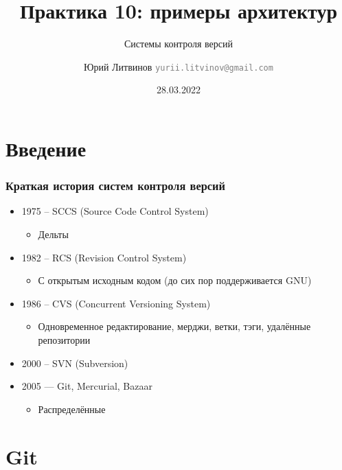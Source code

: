 \documentclass[xetex,mathserif,serif]{beamer}
\title{Практика 10: примеры архитектур}
\subtitle{Системы контроля версий}
\author[Юрий Литвинов]{Юрий Литвинов \newline \textcolor{gray}{\small\texttt{yurii.litvinov@gmail.com}}}
\date{28.03.2022}
\begin{document}
    
\frame{\titlepage}

    \section{Введение}

    \begin{frame}
        \frametitle{Краткая история систем контроля версий}
        \begin{itemize}
            \item 1975 -- SCCS (Source Code Control System)
            \begin{itemize}
                \item Дельты
            \end{itemize}
            \item 1982 -- RCS (Revision Control System)
            \begin{itemize}
                \item С открытым исходным кодом (до сих пор поддерживается GNU)
            \end{itemize}
            \item 1986 -- CVS (Concurrent Versioning System)
            \begin{itemize}
                \item Одновременное редактирование, мерджи, ветки, тэги, удалённые репозитории
            \end{itemize}
            \item 2000 -- SVN (Subversion)
            \item 2005 --- Git, Mercurial, Bazaar
            \begin{itemize}
                \item Распределённые
            \end{itemize}
        \end{itemize}
    \end{frame}

    \section{Git}
\end{document}
